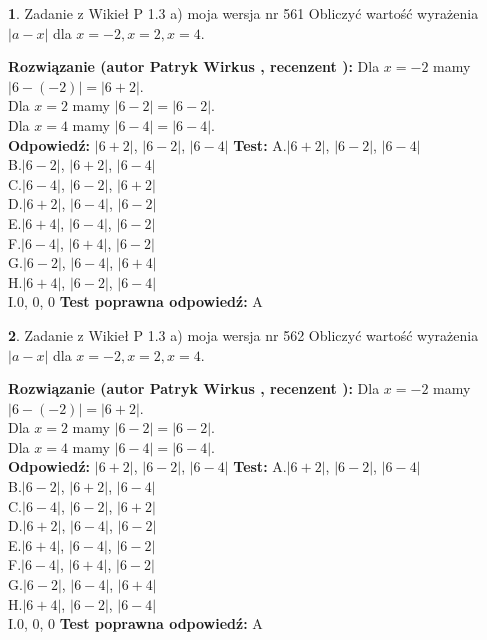 \documentclass[12pt, a4paper]{article}
\theoremstyle{definition} %
\newtheorem{zad}{}
\newcommand{\zadStart}[1]{\begin{zad}#1\newline}
\newcommand{\zadStop}{\end{zad}}
\newcommand{\rozwStart}[2]{\noindent \textbf{Rozwiązanie (autor #1 , recenzent #2): }\newline}
\newcommand{\rozwStop}{\newline}
\newcommand{\odpStart}{\noindent \textbf{Odpowiedź:}\newline}
\newcommand{\odpStop}{\newline}
\newcommand{\testStart}{\noindent \textbf{Test:}\newline}
\newcommand{\testStop}{\newline}
\newcommand{\kluczStart}{\noindent \textbf{Test poprawna odpowiedź:}\newline}
\newcommand{\kluczStop}{\newline}
\begin{document}
\zadStart{Zadanie z Wikieł P 1.3 a) moja wersja nr 561}
Obliczyć wartość wyrażenia $|a - x|$ dla $x=-2,x=2,x=4$.
\zadStop
\rozwStart{Patryk Wirkus}{}
Dla $x = -2$ mamy $|6 - (-2)| = |6 + 2|$.\\
Dla $x = 2$ mamy $|6 - 2| = |6 - 2|$.\\
Dla $x = 4$ mamy $|6 - 4| = |6 - 4|$.\\
\rozwStop
\odpStart
$|6 + 2|$, $|6 - 2|$, $|6 - 4|$
\odpStop
\testStart
A.$|6 + 2|$, $|6 - 2|$, $|6 - 4|$\\
B.$|6 - 2|$, $|6 + 2|$, $|6 - 4|$\\
C.$|6 - 4|$, $|6 - 2|$, $|6 + 2|$\\
D.$|6 + 2|$, $|6 - 4|$, $|6 - 2|$\\
E.$|6 + 4|$, $|6 - 4|$, $|6 - 2|$\\
F.$|6 - 4|$, $|6 + 4|$, $|6 - 2|$\\
G.$|6 - 2|$, $|6 - 4|$, $|6 + 4|$\\
H.$|6 + 4|$, $|6 - 2|$, $|6 - 4|$\\
I.$0$, $0$, $0$
\testStop
\kluczStart
A
\kluczStop



\zadStart{Zadanie z Wikieł P 1.3 a) moja wersja nr 562}
Obliczyć wartość wyrażenia $|a - x|$ dla $x=-2,x=2,x=4$.
\zadStop
\rozwStart{Patryk Wirkus}{}
Dla $x = -2$ mamy $|6 - (-2)| = |6 + 2|$.\\
Dla $x = 2$ mamy $|6 - 2| = |6 - 2|$.\\
Dla $x = 4$ mamy $|6 - 4| = |6 - 4|$.\\
\rozwStop
\odpStart
$|6 + 2|$, $|6 - 2|$, $|6 - 4|$
\odpStop
\testStart
A.$|6 + 2|$, $|6 - 2|$, $|6 - 4|$\\
B.$|6 - 2|$, $|6 + 2|$, $|6 - 4|$\\
C.$|6 - 4|$, $|6 - 2|$, $|6 + 2|$\\
D.$|6 + 2|$, $|6 - 4|$, $|6 - 2|$\\
E.$|6 + 4|$, $|6 - 4|$, $|6 - 2|$\\
F.$|6 - 4|$, $|6 + 4|$, $|6 - 2|$\\
G.$|6 - 2|$, $|6 - 4|$, $|6 + 4|$\\
H.$|6 + 4|$, $|6 - 2|$, $|6 - 4|$\\
I.$0$, $0$, $0$
\testStop
\kluczStart
A
\kluczStop
\end{document}
